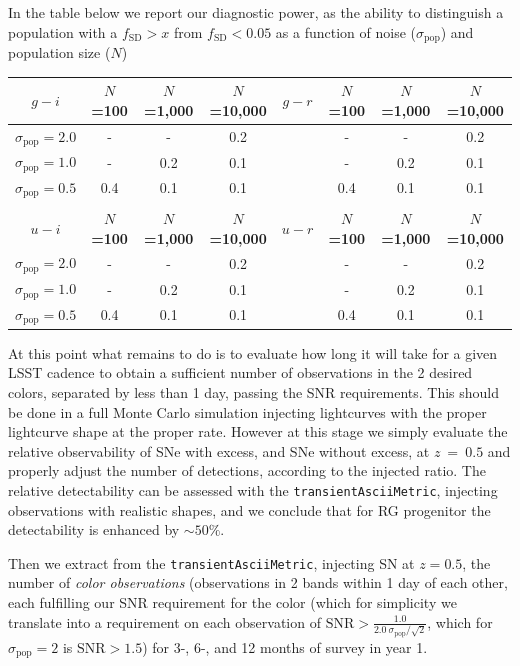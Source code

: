 In the table below we report our diagnostic power, as the ability to distinguish a population with a $f_\mathrm{SD} > x$ from $f_\mathrm{SD}<0.05$ as a function of noise ($\sigma_\mathrm{pop}$) and population size ($N$)

\begin{center}
\begin{tabular}{ c | c| c| c | c | c| c| c | } 
$g-i$&\bf{$N$=100}&\bf{$N$=1,000}&\bf{$N$=10,000}& $g-r$&\bf{$N$=100}&\bf{$N$=1,000}&\bf{$N$=10,000} \\
  \hline
 \bf{$\sigma_\mathrm{pop} = 2.0$}&  -  & -  &  0.2 & &  -  & -  &  0.2 \\
 \bf{$\sigma_\mathrm{pop} = 1.0$}&  -  & 0.2 & 0.1 & &  -  & 0.2 & 0.1 \\
 \bf{$\sigma_\mathrm{pop} = 0.5$}& 0.4 & 0.1 & 0.1 & & 0.4 & 0.1 & 0.1 \\
&&&&&&&\\ $u-i$&\bf{$N$=100}&\bf{$N$=1,000}&\bf{$N$=10,000} & $u-r$&\bf{$N$=100}&\bf{$N$=1,000}&\bf{$N$=10,000}\\
 \bf{$\sigma_\mathrm{pop} = 2.0$}&  -  & -  &  0.2 & &  -  & -  &  0.2 \\
 \bf{$\sigma_\mathrm{pop} = 1.0$}&  -  & 0.2 & 0.1 & &  -  & 0.2 & 0.1 \\
 \bf{$\sigma_\mathrm{pop} = 0.5$}& 0.4 & 0.1 & 0.1 & & 0.4 & 0.1 & 0.1 \\

 \hline
\end{tabular}
\end{center}

At this point what remains to do is to evaluate how long it will take for a given LSST cadence to obtain a sufficient number of observations in the 2 desired colors, separated by less than 1 day, passing the SNR requirements. This should be done in a full Monte Carlo simulation injecting lightcurves with the proper lightcurve shape at the proper rate. However at this stage we simply evaluate the relative observability of SNe with excess, and SNe without excess, at $z~=~0.5$ and properly adjust the number of detections, according to the injected ratio. The relative detectability can be assessed with the \texttt{transientAsciiMetric}, injecting observations with realistic shapes, and we conclude that for RG progenitor the detectability is enhanced by $\sim50\%$.

Then we extract from the  \texttt{transientAsciiMetric}, injecting SN at $z=0.5$, the number of \emph{color observations} (observations in 2 bands within 1 day of each other, each fulfilling our SNR requirement for the color (which for simplicity we translate into a requirement on each observation of $\mathrm{SNR} > \frac{1.0}{2.0~\sigma_\mathrm{pop}/\sqrt{2}}$, which for $\sigma_\mathrm{pop}=2$ is $\mathrm{SNR}>1.5$) for 3-, 6-, and 12 months of survey in year 1.

